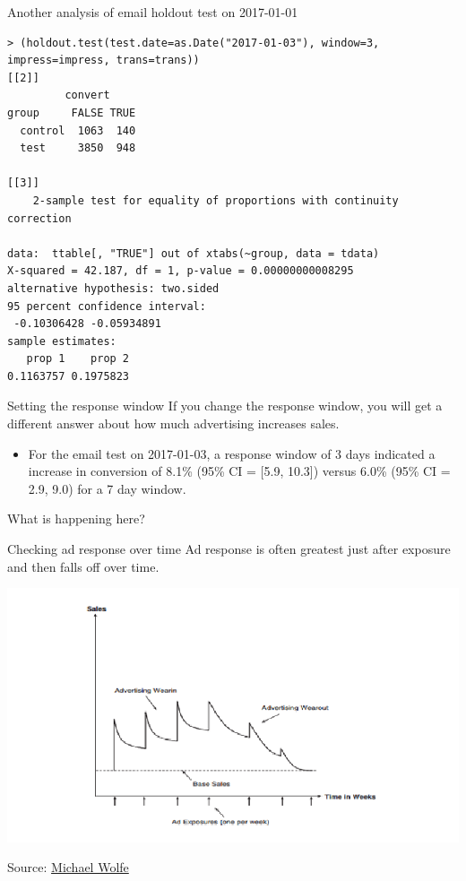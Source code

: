 \documentclass[10pt, aspectratio=169]{beamer}
\newcommand{\source}[1]{\begin{flushright} \footnotesize Source: {#1} \end{flushright} \normalsize}
\begin{document}
\begin{frame}[fragile]{Another analysis of email holdout test on 2017-01-01}
\footnotesize
\begin{lstlisting}[basicstyle=\scriptsize\ttfamily]
 > (holdout.test(test.date=as.Date("2017-01-03"), window=3, impress=impress, trans=trans))
[[2]]
         convert
group     FALSE TRUE
  control  1063  140
  test     3850  948
  
[[3]]
	2-sample test for equality of proportions with continuity correction

data:  ttable[, "TRUE"] out of xtabs(~group, data = tdata)
X-squared = 42.187, df = 1, p-value = 0.00000000008295
alternative hypothesis: two.sided
95 percent confidence interval:
 -0.10306428 -0.05934891
sample estimates:
   prop 1    prop 2 
0.1163757 0.1975823 
\end{lstlisting}
\end{frame}

\begin{frame}{Setting the response window}
If you change the response window, you will get a different answer about how much advertising increases sales. 
\begin{itemize}
\pause \item For the email test on 2017-01-03, a response window of 3 days indicated a increase in conversion of 8.1\% (95\% CI = [5.9, 10.3]) versus 6.0\% (95\% CI = 2.9, 9.0) for a 7 day window.  
\end{itemize}
\alert{What is happening here?}
\end{frame} 

\begin{frame}{Checking ad response over time}
Ad response is often greatest just after exposure and then falls off over time.
\begin{center}
\includegraphics[height=0.7\textheight]{images/adresponseovertime.png}
\end{center}
\source{\href{https://www.linkedin.com/pulse/new-tools-determining-measuring-wear-in-wear-out-media-michael-wolfe}{Michael Wolfe}}
\end{frame}
\end{document}
